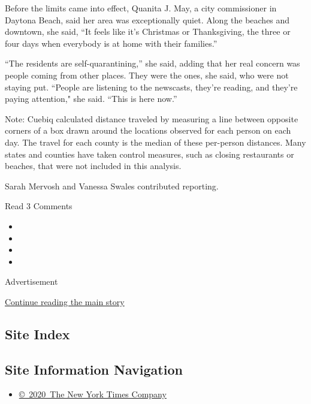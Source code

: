 Before the limits came into effect, Quanita J. May, a city commissioner
in Daytona Beach, said her area was exceptionally quiet. Along the
beaches and downtown, she said, ``It feels like it's Christmas or
Thanksgiving, the three or four days when everybody is at home with
their families.''

``The residents are self-quarantining,'' she said, adding that her real
concern was people coming from other places. They were the ones, she
said, who were not staying put. ``People are listening to the newscasts,
they're reading, and they're paying attention," she said. ``This is here
now.''

Note: Cuebiq calculated distance traveled by measuring a line between
opposite corners of a box drawn around the locations observed for each
person on each day. The travel for each county is the median of these
per-person distances. Many states and counties have taken control
measures, such as closing restaurants or beaches, that were not included
in this analysis.

Sarah Mervosh and Vanessa Swales contributed reporting.

Read 3 Comments

\begin{itemize}
\item
\item
\item
\item
\end{itemize}

Advertisement

\protect\hyperlink{after-bottom}{Continue reading the main story}

\hypertarget{site-index}{%
\subsection{Site Index}\label{site-index}}

\hypertarget{site-information-navigation}{%
\subsection{Site Information
Navigation}\label{site-information-navigation}}

\begin{itemize}
\tightlist
\item
  \href{https://help.nytimes.com/hc/en-us/articles/115014792127-Copyright-notice}{©~2020~The
  New York Times Company}
\end{itemize}

